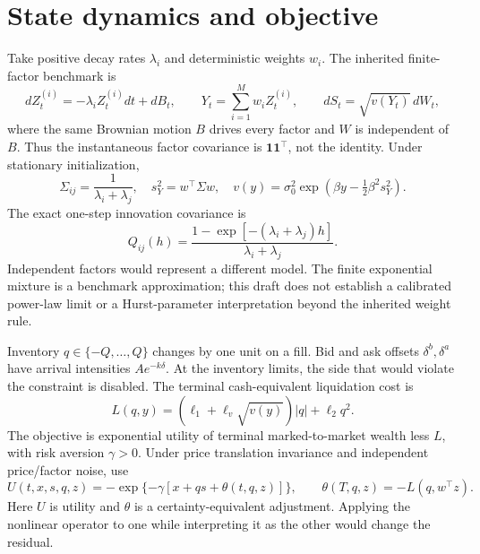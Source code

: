 \section{State dynamics and objective}
Take positive decay rates $\lambda_i$ and deterministic weights $w_i$. The inherited finite-factor benchmark is
\[
 dZ_t^{(i)}=-\lambda_i Z_t^{(i)}dt+dB_t,\qquad
 Y_t=\sum_{i=1}^M w_iZ_t^{(i)},\qquad
 dS_t=\sqrt{v(Y_t)}\,dW_t,
\]
where the same Brownian motion $B$ drives every factor and $W$ is independent of $B$. Thus the instantaneous factor covariance is $\mathbf1\mathbf1^\top$, not the identity. Under stationary initialization,
\[
 \Sigma_{ij}=\frac1{\lambda_i+\lambda_j},\quad
 s_Y^2=w^\top\Sigma w,\quad
 v(y)=\sigma_0^2\exp\!\left(\beta y-\tfrac12\beta^2s_Y^2\right).
\]
The exact one-step innovation covariance is
\[
 Q_{ij}(h)=\frac{1-\exp[-(\lambda_i+\lambda_j)h]}{\lambda_i+\lambda_j}.
\]
Independent factors would represent a different model. The finite exponential mixture is a benchmark approximation; this draft does not establish a calibrated power-law limit or a Hurst-parameter interpretation beyond the inherited weight rule.

Inventory $q\in\{-Q,\ldots,Q\}$ changes by one unit on a fill. Bid and ask offsets $\delta^b,\delta^a$ have arrival intensities $A e^{-k\delta}$. At the inventory limits, the side that would violate the constraint is disabled. The terminal cash-equivalent liquidation cost is
\[
 L(q,y)=(\ell_1+\ell_v\sqrt{v(y)})|q|+\ell_2q^2.
\]
The objective is exponential utility of terminal marked-to-market wealth less $L$, with risk aversion $\gamma>0$. Under price translation invariance and independent price/factor noise, use
\[
 U(t,x,s,q,z)=-\exp\{-\gamma[x+qs+\theta(t,q,z)]\},
 \qquad \theta(T,q,z)=-L(q,w^\top z).
\]
Here $U$ is utility and $\theta$ is a certainty-equivalent adjustment. Applying the nonlinear operator to one while interpreting it as the other would change the residual.

